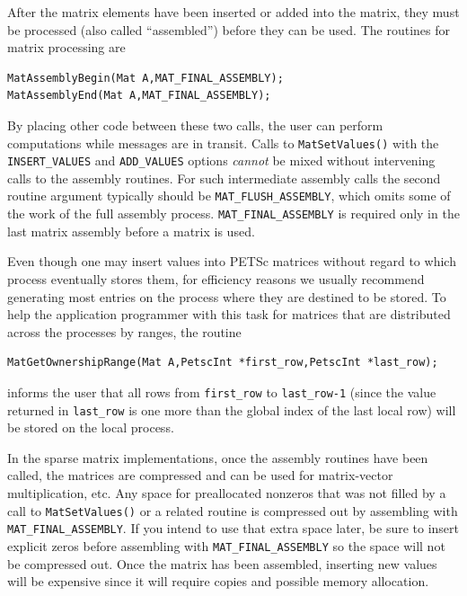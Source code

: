 After the matrix elements have been inserted or added into the matrix,
they must be processed (also called ``assembled'') before they can be used. The routines for matrix
processing are
\begin{lstlisting}
MatAssemblyBegin(Mat A,MAT_FINAL_ASSEMBLY);
MatAssemblyEnd(Mat A,MAT_FINAL_ASSEMBLY);
\end{lstlisting}
By placing other code between these two calls, the user can perform
computations while messages are in transit.
Calls to \lstinline{MatSetValues()} with the \lstinline{INSERT_VALUES} and
\lstinline{ADD_VALUES} options {\em cannot} be mixed without intervening calls to
the assembly routines.  For such intermediate assembly calls the
second routine argument  typically should be \lstinline{MAT_FLUSH_ASSEMBLY},
 which omits some of the work of the full
assembly process.  \lstinline{MAT_FINAL_ASSEMBLY}  is
required only in the last matrix assembly before a matrix is used.

Even though one may insert values into PETSc matrices without regard
to which process eventually stores them, for efficiency
reasons we usually recommend generating most entries on the
process where they are destined to be stored.  To help the
application programmer with this task for matrices that are
distributed across the processes by ranges, the routine
\begin{lstlisting}
MatGetOwnershipRange(Mat A,PetscInt *first_row,PetscInt *last_row);
\end{lstlisting}
informs the user that all rows from \lstinline{first_row} to
\lstinline{last_row-1} (since the value returned in \lstinline{last_row} is one more
than the global index of the last local row) will be stored on the local process.

In the sparse matrix implementations, once the assembly routines have been called, the matrices are compressed and can be used for matrix-vector multiplication, etc.
Any space for preallocated nonzeros that was not filled by a call to \lstinline{MatSetValues()} or a related routine is compressed out by assembling with \lstinline{MAT_FINAL_ASSEMBLY}.
If you intend to use that extra space later, be sure to insert explicit zeros before assembling with \lstinline{MAT_FINAL_ASSEMBLY} so the space will not be compressed out.
Once the matrix has been assembled, inserting new values will be expensive since it will require copies and possible memory allocation.

